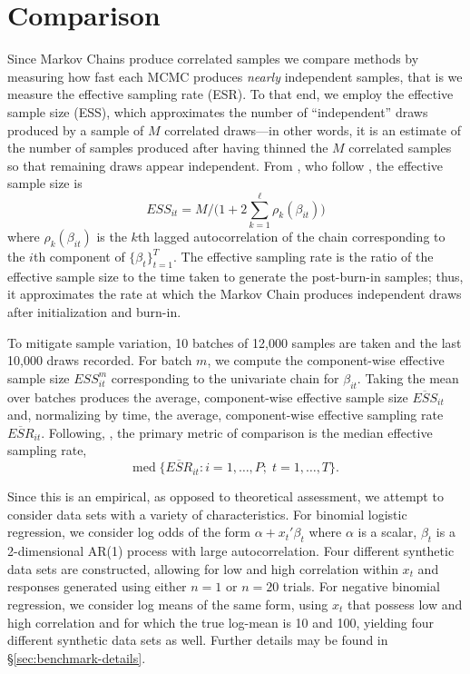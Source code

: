 \documentclass[11pt]{article}
\begin{document}
\section{Comparison}


Since Markov Chains produce correlated samples we compare methods by measuring
how fast each MCMC produces \emph{nearly} independent samples, that is we
measure the effective sampling rate (ESR).  To that end, we employ the effective
sample size (ESS), which approximates the number of ``independent'' draws
produced by a sample of $M$ correlated draws---in other words, it is an estimate
of the number of samples produced after having thinned the $M$ correlated
samples so that remaining draws appear independent.  From
\cite{holmes-held-2006}, who follow \cite{geyer-1992}, the effective sample size
is
\[
ESS_{it} = M / \Big( 1 + 2 \sum_{k=1}^\ell \rho_k(\beta_{it}) \Big)
\]
where $\rho_k(\beta_{it})$ is the $k$th lagged autocorrelation of the chain
corresponding to the $i$th component of $\{\beta_t\}_{t=1}^T$.  The effective
sampling rate is the ratio of the effective sample size to the time taken to
generate the post-burn-in samples; thus, it approximates the rate at which the
Markov Chain produces independent draws after initialization and burn-in.

To mitigate sample variation, 10 batches of 12,000 samples are taken and the
last 10,000 draws recorded.  For batch $m$, we compute the component-wise
effective sample size $ESS_{it}^{m}$ corresponding to the univariate chain for
$\beta_{it}$.  Taking the mean over batches produces the average, component-wise
effective sample size $\overline{ESS}_{it}$ and, normalizing by time, the
average, component-wise effective sampling rate $\overline{ESR}_{it}$.
Following, \cite{fruhwirth-schnatter-fruhwirth-2010}, the primary metric of
comparison is the median effective sampling rate,
\[
\text{med} \; \Big\{ \overline{ESR}_{it} : i=1, \ldots, P; \;  t=1, \ldots, T \Big\}.
\]

Since this is an empirical, as opposed to theoretical assessment, we attempt to
consider data sets with a variety of characteristics.  For binomial logistic
regression, we consider log odds of the form $\alpha + x_t' \beta_t$ where
$\alpha$ is a scalar, $\beta_t$ is a 2-dimensional AR(1) process with large
autocorrelation.  Four different synthetic data sets are constructed, allowing
for low and high correlation within $x_t$ and responses generated using either
$n=1$ or $n=20$ trials.  For negative binomial regression, we consider log means
of the same form, using $x_t$ that possess low and high correlation and for
which the true log-mean is 10 and 100, yielding four different synthetic data
sets as well.  Further details may be found in \S \ref{sec:benchmark-details}.
\end{document}
